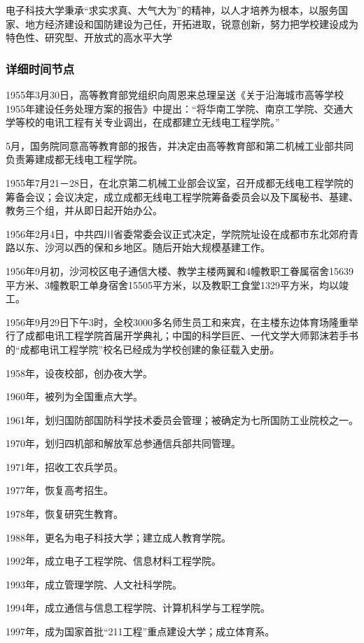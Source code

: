 \documentclass[UTF8]{ctexart}
\begin{document}
    电子科技大学秉承“求实求真、大气大为”的精神，以人才培养为根本，以服务国家、地方经济建设和国防建设为己任，开拓进取，锐意创新，努力把学校建设成为特色性、研究型、开放式的高水平大学

    \subsubsection{详细时间节点}
    1955年3月30日，高等教育部党组织向周恩来总理呈送《关于沿海城市高等学校1955年建设任务处理方案的报告》中提出：“将华南工学院、南京工学院、交通大学等校的电讯工程有关专业调出，在成都建立无线电工程学院。”
    
    5月，国务院同意高等教育部的报告，并决定由高等教育部和第二机械工业部共同负责筹建成都无线电工程学院。


1955年7月21－28日，在北京第二机械工业部会议室，召开成都无线电工程学院的筹备会议；会议决定，成立成都无线电工程学院筹备委员会以及下属秘书、基建、教务三个组，并从即日起开始办公。


1956年2月4日，中共四川省委常委会议正式决定，学院院址设在成都市东北郊府青路以东、沙河以西的保和乡地区。随后开始大规模基建工作。


1956年9月初，沙河校区电子通信大楼、教学主楼两翼和4幢教职工眷属宿舍15639平方米、3幢教职工单身宿舍15505平方米，以及教职工食堂1329平方米，均以竣工。

1956年9月29日下午3时，全校3000多名师生员工和来宾，在主楼东边体育场隆重举行了成都电讯工程学院首届开学典礼；中国的科学巨匠、一代文学大师郭沫若手书的“成都电讯工程学院”校名已经成为学校创建的象征载入史册。


1958年，设夜校部，创办夜大学。


1960年，被列为全国重点大学。


1961年，划归国防部国防科学技术委员会管理；被确定为七所国防工业院校之一。


1970年，划归四机部和解放军总参通信兵部共同管理。


1971年，招收工农兵学员。


1977年，恢复高考招生。


1978年，恢复研究生教育。


1988年，更名为电子科技大学；建立成人教育学院。


1992年，成立电子工程学院、信息材料工程学院。


1993年，成立管理学院、人文社科学院。


1994年，成立通信与信息工程学院、计算机科学与工程学院。


1997年，成为国家首批“211工程”重点建设大学；成立体育系。
\end{document}
